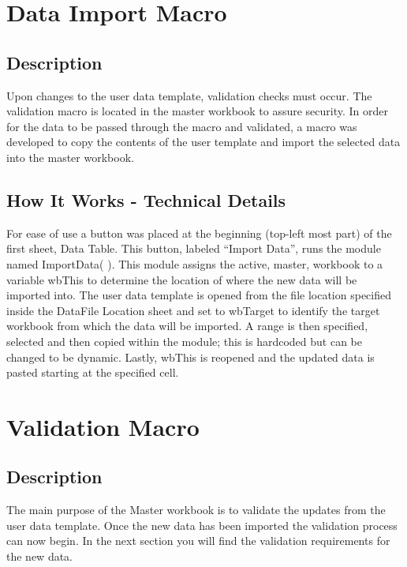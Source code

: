 \documentclass[12pt,a4paper]{report}
\begin{document}
\chapter{Data Import Macro}
    \section{Description}
    Upon changes to the user data template, validation checks must occur. The validation macro is located in the master workbook to assure security. In order for the data to be passed through the macro and validated, a macro was developed to copy the contents of the user template and import the selected data into the master workbook.
    
    \section{How It Works - Technical Details}
    For ease of use a button was placed at the beginning (top-left most part) of the first sheet, Data Table. This button, labeled “Import Data”, runs the module named ImportData( ).
    \newline
    \newline
    This module assigns the active, master, workbook to a variable wbThis to determine the location of where the new data will be imported into. The user data template is opened from the file location specified inside the DataFile Location sheet and set to wbTarget to identify the target workbook from which the data will be imported. 
    \newline
    \newline
    A range is then specified, selected and then copied within the module; this is hardcoded but can be changed to be dynamic. Lastly, wbThis is reopened and the updated data is pasted starting at the specified cell. 

\chapter{Validation Macro}
    \section{Description}
    
    The main purpose of the Master workbook is to validate the updates from the user data template. Once the new data has been imported the validation process can now begin. In the next section you will find the validation requirements for the new data.
    
\end{document}
